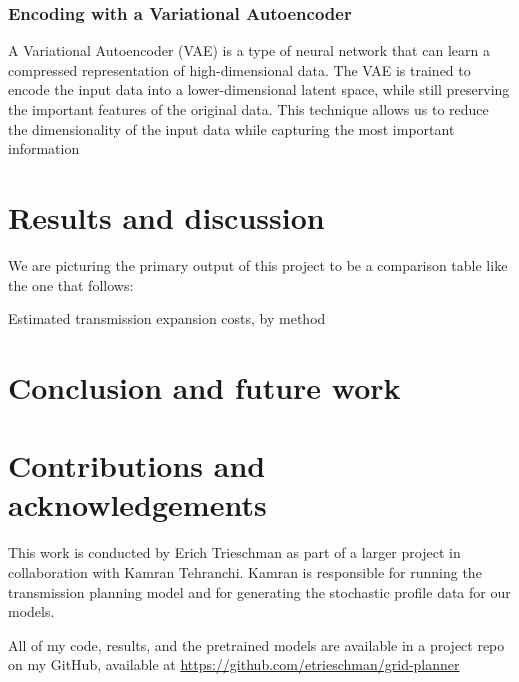 \documentclass[10pt,twocolumn,letterpaper]{article}
\begin{document}
\subsubsection{Encoding with a Variational Autoencoder}
A Variational Autoencoder (VAE) is a type of neural network that can learn a compressed representation of high-dimensional data. The VAE is trained to encode the input data into a lower-dimensional latent space, while still preserving the important features of the original data. This technique allows us to reduce the dimensionality of the input data while capturing the most important information \cite{odaibo2019tutorial}


\section{Results and discussion}
\label{sec:results}

We are picturing the primary output of this project to be a comparison table like the one that follows:
\begin{table}[!htbp]
    \tiny
    \begin{center}
        \caption{\label{fig:summ} Estimated transmission expansion costs, by method}
        
    \end{center}
\end{table}

\section{Conclusion and future work}
\label{sec:conclusion}


\section{Contributions and acknowledgements}
\label{sec:contrib}
This work is conducted by Erich Trieschman as part of a larger project in collaboration with Kamran Tehranchi. Kamran is responsible for running the transmission planning model and for generating the stochastic profile data for our models. 

All of my code, results, and the pretrained models are available in a project repo on my GitHub, available at \url{https://github.com/etrieschman/grid-planner}

{\small


}
\end{document}
